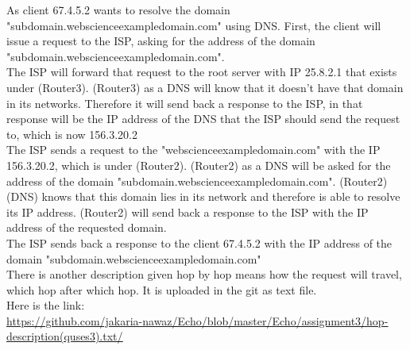 \documentclass{WeSTassignment}
\begin{document}
As client 67.4.5.2 wants to resolve the domain "subdomain.webscienceexampledomain.com" using DNS. First, the client will issue a request to the ISP, asking for the address of the domain "subdomain.webscienceexampledomain.com". \\
The ISP will forward that request to the root server with IP 25.8.2.1 that exists under (Router3). (Router3) as a DNS will know that it doesn't have that domain in its networks. Therefore it will send back a response to the ISP, in that response will be the IP address of the DNS that the ISP should send the request to, which is now 156.3.20.2 \\
The ISP sends a request to the "webscienceexampledomain.com" with the IP 156.3.20.2, which is under (Router2). (Router2) as a DNS will be asked for the address of the domain "subdomain.webscienceexampledomain.com". (Router2) (DNS) knows that this domain lies in its network and therefore is able to resolve its IP address. (Router2) will send back a response to the ISP with the IP address of the requested domain. \\
The ISP sends back a response to the client 67.4.5.2 with the IP address of the domain "subdomain.webscienceexampledomain.com" \\
There is another description given hop by hop means how the request will travel, which hop after which hop. It is uploaded in the git as text file.\\ Here is the link: \\
{\color{blue}\underline{\href{https://github.com/jakaria-nawaz/Echo/blob/master/Echo/assignment3/hop-description(quses3).txt/}{https://github.com/jakaria-nawaz/Echo/blob/master/Echo/assignment3/hop-description(quses3).txt/}}}





\makefooter
\end{document}
